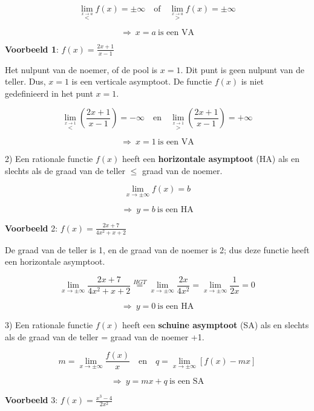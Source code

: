 \[
{\displaystyle {\displaystyle \lim_{\overset{x\rightarrow a}{<}}}f(x)=\pm\infty\quad\textrm{of}\quad{\displaystyle \lim_{\overset{x\rightarrow a}{>}}}f(x)=\pm\infty}
\]


\[
{\displaystyle \Rightarrow\:x=a\:\textrm{is een VA}}
\]


\textbf{Voorbeeld 1}: ${\displaystyle f(x)=\frac{2x+1}{x-1}}$ 

Het nulpunt van de noemer, of de pool is $x=1$. Dit punt is geen
nulpunt van de teller. Dus, $x=1$ is een verticale asymptoot. De
functie $f(x)$ is niet gedefinieerd in het punt $x=1$.

\[
{\displaystyle {\displaystyle \lim_{\overset{x\rightarrow1}{<}}}\left(\frac{2x+1}{x-1}\right)=-\infty\quad\textrm{en}\quad{\displaystyle \lim_{\overset{x\rightarrow1}{>}}}\left(\frac{2x+1}{x-1}\right)=+\infty}
\]


\[
{\displaystyle \Rightarrow\:x=1\:\textrm{is een VA}}
\]


\medskip{}


2) Een rationale functie $f(x)$ heeft een \textbf{horizontale asymptoot}
(HA) als en slechts als de graad van de teller \ensuremath{\le} graad
van de noemer.

\[
{\displaystyle {\displaystyle \lim_{x\to\pm\infty}}f(x)=b}
\]


\[
{\displaystyle \Rightarrow\:y=b\:\textrm{is een HA}}
\]


\textbf{Voorbeeld }2: ${\displaystyle f(x)=\frac{2x+7}{4x^{2}+x+2}}$ 

De graad van de teller is 1, en de graad van de noemer is 2; dus deze
functie heeft een horizontale asymptoot.

\[
{\displaystyle {\displaystyle \lim_{x\to\pm\infty}}\frac{2x+7}{4x^{2}+x+2}\overset{HGT}{=}{\displaystyle \lim_{x\to\pm\infty}}\frac{2x}{4x^{2}}={\displaystyle \lim_{x\to\pm\infty}}\frac{1}{2x}=0}
\]


\[
{\displaystyle \Rightarrow\:y=0\:\textrm{is een HA}}
\]
\medskip{}


3) Een rationale functie $f(x)$ heeft een \textbf{schuine asymptoot}
(SA) als en slechts als de graad van de teller = graad van de noemer
+1.

\[
{\displaystyle m={\displaystyle \lim_{x\to\pm\infty}}\frac{f(x)}{x}\quad\textrm{en}\quad q={\displaystyle \lim_{x\to\pm\infty}}\left[f(x)-mx\right]}
\]


\[
{\displaystyle \Rightarrow\:y=mx+q\:\textrm{is een SA}}
\]


\textbf{Voorbeeld }3: ${\displaystyle f(x)=\frac{x^{3}-4}{2x^{2}}}$ 

